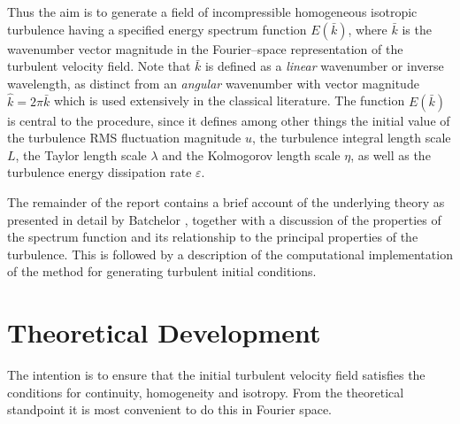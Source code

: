 \documentclass[dvips]{article}
\begin{document}
Thus the aim is to generate a field of incompressible homogeneous isotropic
turbulence having a specified energy spectrum function $E(\bar{k})$,
where $\bar{k}$ is the wavenumber vector magnitude
in the Fourier--space representation of the turbulent velocity field.
Note that $\bar{k}$ is defined as a {\it linear} wavenumber or inverse
wavelength, as distinct from an {\it angular} wavenumber with vector
magnitude $\hat{k}=2\pi \bar{k}$
which is used extensively in the classical literature.
The function $E(\bar{k})$ is central to the procedure, since it defines
among other things the initial value of the turbulence RMS
fluctuation magnitude $u$, the turbulence integral length scale $L$,
the Taylor length scale $\lambda$ and the Kolmogorov length scale $\eta$,
as well as the turbulence energy dissipation rate $\varepsilon$.

The remainder of the report contains a brief account of the underlying theory
as presented in detail by Batchelor \cite{batchelor53}, together with a
discussion of the properties of the spectrum function and its
relationship to the principal properties of the turbulence.  This is followed
by a description of the computational implementation of the method for
generating turbulent initial conditions.

\section{Theoretical Development}
The intention is to ensure that the initial turbulent velocity field
satisfies the conditions for continuity, homogeneity and isotropy.  From the
theoretical standpoint it is most convenient to do this in Fourier
space.
\end{document}
